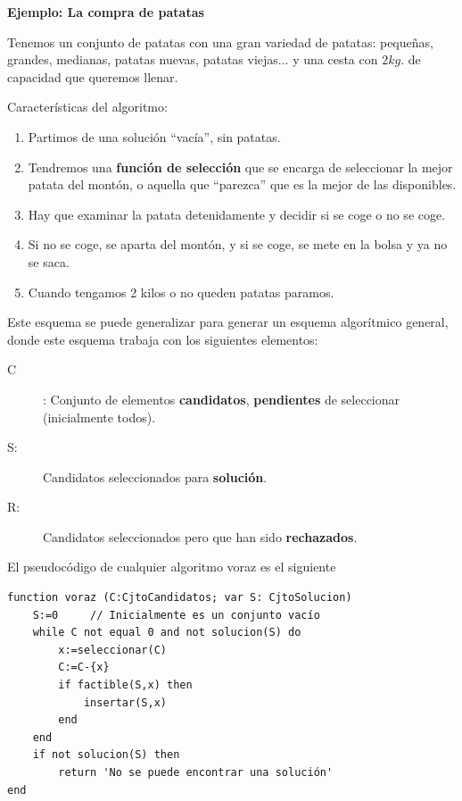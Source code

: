 \documentclass[10pt,a4paper,spanish]{report}
\theoremstyle{definition}
\theoremstyle{remark}
\begin{document}
\textbf{\textcolor{electriccrimson}{Ejemplo}: La compra de patatas}

Tenemos un conjunto de patatas con una gran variedad de patatas: pequeñas, grandes, medianas, patatas nuevas, patatas viejas... y una cesta con $2kg.$ de capacidad que queremos llenar.

Características del algoritmo:
\begin{enumerate}[---]
    \item Partimos de una solución ``vacía'', sin patatas.
    \item Tendremos una \textbf{\textcolor{electriccrimson}{función de selección}} que se encarga de seleccionar la mejor patata del montón, o aquella que ``parezca'' que es la mejor de las disponibles. 
    \item Hay que examinar la patata detenidamente y decidir si se coge o no se coge.
    \item Si no se coge, se aparta del montón, y si se coge, se mete en la bolsa y ya no se saca.
    \item Cuando tengamos 2 kilos o no queden patatas paramos.
\end{enumerate}

Este esquema se puede generalizar para generar un esquema algorítmico general, donde este esquema trabaja con los siguientes elementos:
\begin{description}
    \item[C]: Conjunto de elementos \textbf{\textcolor{electriccrimson}{candidatos}}, \textbf{\textcolor{electriccrimson}{pendientes}} de seleccionar (inicialmente todos).
    \item[S:] Candidatos seleccionados para \textbf{\textcolor{electriccrimson}{solución}}.
    \item[R:] Candidatos seleccionados pero que han sido \textbf{\textcolor{electriccrimson}{rechazados}}.
\end{description}

El pseudocódigo de cualquier algoritmo voraz es el siguiente
\begin{verbatim}
function voraz (C:CjtoCandidatos; var S: CjtoSolucion)
    S:=0     // Inicialmente es un conjunto vacío
    while C not equal 0 and not solucion(S) do
        x:=seleccionar(C)
        C:=C-{x}
        if factible(S,x) then
            insertar(S,x)
        end
    end
    if not solucion(S) then
        return 'No se puede encontrar una solución'
end
\end{verbatim}
\end{document}
